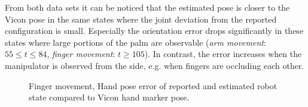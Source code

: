 From both data sets it can be noticed that the estimated pose is closer to the Vicon pose in the same states where the joint deviation from the reported configuration is small. Especially the orientation error drops significantly in these states where large portions of the palm are observable (\textit{arm movement}: $55\leq t \leq84$, \textit{finger movement}: $t \geq 105$). In contrast, the error increases when the manipulator is observed from the side, e.g. when fingers are occluding each other.

\begin{figure}
\centering
{}


\caption{Finger movement, Hand pose error of reported and estimated robot state compared to Vicon hand marker pose.}
\label{fig:vic_error_finger_movement}
\end{figure}


